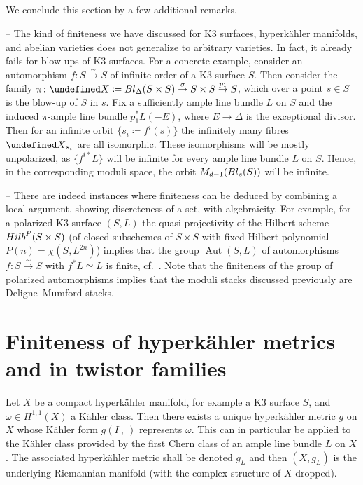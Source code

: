 \documentclass[11pt]{article}
\makeatletter
\theoremstyle{definition}
\numberwithin{equation}{section}
\numberwithin{figure}{section}
\numberwithin{table}{section}
\let\cal\undefined
\DeclareMathOperator{\Aut}{Aut}
\newcommand{\cal}{\mathcal}
\newcommand{\kx}{{\cal X}}
\newcommand{\congpf}{\overset{\sim}{\rightarrow}}%
\renewcommand{\cong}{\simeq}
\makeatother
\begin{document}
\subsection{}\label{sec:explainGT}
We conclude this section by a few additional remarks.
\smallskip

-- The kind of finiteness we have discussed for K3 surfaces, hyperk\"ahler manifolds, and abelian varieties does not generalize to arbitrary varieties. In fact, it already fails for blow-ups of K3 surfaces. For a concrete example, consider an automorphism $f\colon S\congpf S$ of infinite order of a K3 surface $S$. Then consider the family $\pi\colon\kx\coloneqq {\rm Bl}_\Delta(S\times S)\stackrel{\sigma}{\to} S\times S\stackrel{p_1}{\to}S$, which over a point $s\in S$ is the blow-up of $S$ in $s$. Fix a sufficiently ample line bundle $L$ on $S$ and the induced $\pi$-ample line bundle $p_1^*L(-E)$, where $E\to\Delta$ is the exceptional divisor. Then for an infinite orbit $\{s_i\coloneqq f^{i}(s)\}$ the infinitely many fibres $\kx_{s_i}$ are all isomorphic. These isomorphisms will be mostly unpolarized, as $\{f^{i\ast}L\}$ will be infinite for every ample line bundle $L$ on $S$. Hence, in the corresponding moduli space, the orbit $M_{d-1}({\rm Bl}_s(S))$ will be infinite.

\smallskip

-- There are indeed instances where finiteness can be deduced by combining a local argument, showing discreteness of a set, with algebraicity. For example, for a polarized K3 surface $(S,L)$ the quasi-projectivity of the Hilbert scheme ${\rm Hilb}^{P}(S\times S)$ (of closed subschemes of $S\times S$ with fixed Hilbert polynomial $P(n)=\chi(S,L^{2n})$) implies that the group $\Aut(S,L)$ of automorphisms $f\colon S\congpf S$ with $f^*L\cong L$ is finite, cf.~\cite[Chapter~5]{HuyK3}. Note that the finiteness of the group of polarized automorphisms implies that the moduli stacks discussed previously are Deligne--Mumford stacks.


\section{Finiteness of hyperk\"ahler metrics and in twistor families}

Let $X$ be a compact hyperk\"ahler manifold, for example a K3 surface $S$, and $\omega\in H^{1,1}(X)$ a K\"ahler class. Then there exists a unique hyperk\"ahler metric $g$ on $X$ whose K\"ahler form $g(I~,~)$ represents $\omega$. This can in particular be applied to the K\"ahler class provided by the first Chern class of an ample line bundle $L$ on $X$. The associated hyperk\"ahler metric shall be denoted $g_L$ and then $(X,g_L)$ is the underlying Riemannian manifold (with the complex structure of $X$ dropped).
\end{document}
